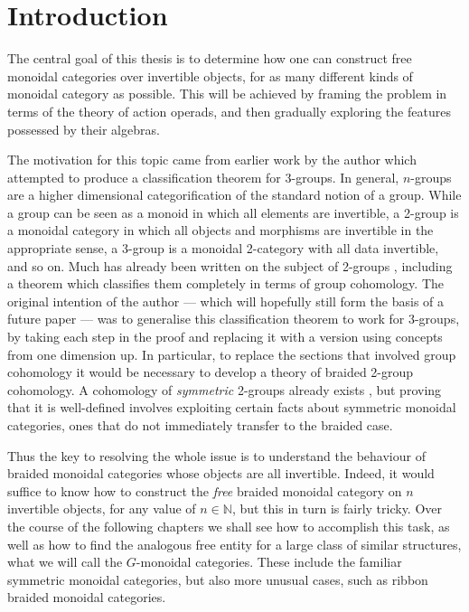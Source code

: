 \chapter{Introduction}
 
The central goal of this thesis is to determine how one can construct free monoidal categories over invertible objects, for as many different kinds of monoidal category as possible. This will be achieved by framing the problem in terms of the theory of action operads, and then gradually exploring the features possessed by their algebras.

The motivation for this topic came from earlier work by the author which attempted to produce a classification theorem for 3-groups. In general, $n$-groups are a higher dimensional categorification of the standard notion of a group. While a group can be seen as a monoid in which all elements are invertible, a 2-group is a monoidal category in which all objects and morphisms are invertible in the appropriate sense, a 3-group is a monoidal 2-category with all data invertible, and so on. Much has already been written on the subject of 2-groups \cite{hda5}, including a theorem which classifies them completely in terms of group cohomology. The original intention of the author --- which will hopefully still form the basis of a future paper --- was to generalise this classification theorem to work for 3-groups, by taking each step in the proof and replacing it with a version using concepts from one dimension up. In particular, to replace the sections that involved group cohomology it would be necessary to develop a theory of braided 2-group cohomology. A cohomology of \emph{symmetric} 2-groups already exists \cite{picard}, but proving that it is well-defined involves exploiting certain facts about symmetric monoidal categories, ones that do not immediately transfer to the braided case.   

Thus the key to resolving the whole issue is to understand the behaviour of braided monoidal categories whose objects are all invertible. Indeed, it would suffice to know how to construct the \emph{free} braided monoidal category on $n$ invertible objects, for any value of $n \in \mathbb{N}$, but this in turn is fairly tricky. Over the course of the following chapters we shall see how to accomplish this task, as well as how to find the analogous free entity for a large class of similar structures, what we will call the $G$-monoidal categories. These include the familiar symmetric monoidal categories, but also more unusual cases, such as ribbon braided monoidal categories. 

